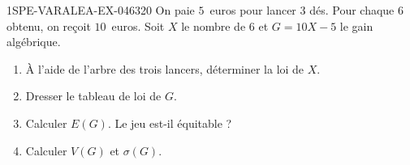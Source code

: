 \begin{exercice}{1SPE-VARALEA-EX-046}{3}{20}
On paie $5$~euros pour lancer $3$ dés. Pour chaque $6$ obtenu, on reçoit $10$~euros. Soit $X$ le nombre de $6$ et $G = 10X - 5$ le gain algébrique.

\begin{enumerate}
  \item À l'aide de l'arbre des trois lancers, déterminer la loi de $X$.
  \item Dresser le tableau de loi de $G$.
  \item Calculer $E(G)$. Le jeu est-il équitable ?
  \item Calculer $V(G)$ et $\sigma(G)$.
\end{enumerate}
\end{exercice}
